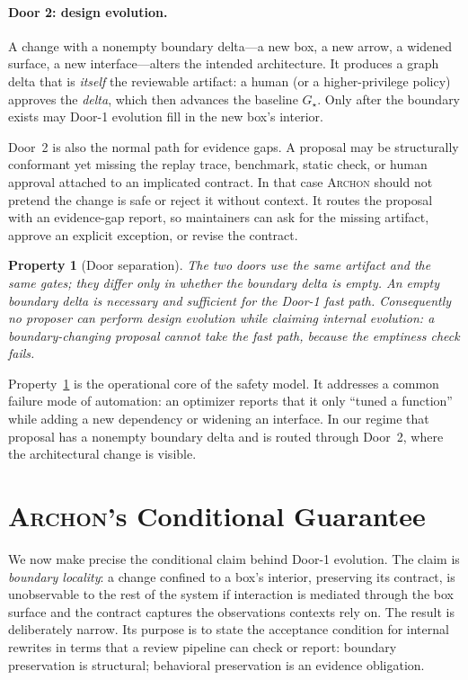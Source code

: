 \documentclass[sigconf,review,anonymous]{acmart}
\theoremstyle{plain}
\newtheorem{property}[theorem]{Property}
\theoremstyle{definition}
\begin{document}
\paragraph{Door 2: design evolution.}
A change with a nonempty boundary delta---a new box, a new arrow, a widened
surface, a new interface---alters the intended architecture. It produces a
graph delta that is \emph{itself} the reviewable artifact: a human (or a
higher-privilege policy) approves the \emph{delta}, which then advances the
baseline $G_\star$. Only after the boundary exists may Door-1 evolution fill in
the new box's interior.

Door~2 is also the normal path for evidence gaps. A proposal may be structurally
conformant yet missing the replay trace, benchmark, static check, or human
approval attached to an implicated contract. In that case \textsc{Archon} should not
pretend the change is safe or reject it without context. It routes the proposal
with an evidence-gap report, so maintainers can ask for the missing artifact,
approve an explicit exception, or revise the contract.

\begin{property}[Door separation]\label{prop:doors}
The two doors use the same artifact and the same gates; they differ only in
whether the boundary delta is empty. An empty boundary delta is necessary and
sufficient for the Door-1 fast path. Consequently no proposer can perform design
evolution while claiming internal evolution: a boundary-changing proposal
\emph{cannot} take the fast path, because the emptiness check fails.
\end{property}

\noindent
Property~\ref{prop:doors} is the operational core of the safety model. It
addresses a common failure mode of automation: an optimizer reports that it only
``tuned a function'' while adding a new dependency or widening an interface. In
our regime that proposal has a nonempty boundary delta and is routed through
Door~2, where the architectural change is visible.

\section{\textsc{Archon}'s Conditional Guarantee}\label{sec:guarantees}

We now make precise the conditional claim behind Door-1 evolution. The claim is
\emph{boundary locality}: a change confined to a box's interior, preserving its
contract, is unobservable to the rest of the system if interaction is mediated
through the box surface and the contract captures the observations contexts rely
on. The result is deliberately narrow. Its purpose is to state the acceptance
condition for internal rewrites in terms that a review pipeline can check or
report: boundary preservation is structural; behavioral preservation is an
evidence obligation.
\end{document}
